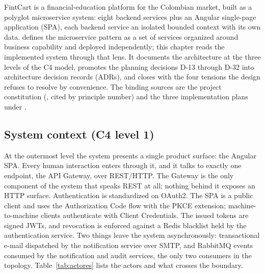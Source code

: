 FintCart is a financial-education platform for the Colombian market, built as a
polyglot microservice system: eight backend services plus an Angular single-page
application (SPA), each backend service an isolated bounded context with its own
data. \textcite{richardsonndpattern} defines the microservice pattern as a set of
services organized around business capability and deployed independently; this
chapter reads the implemented system through that lens. It documents the
architecture at the three levels of the C4 model, promotes the planning decisions
D-13 through D-32 into architecture decision records (ADRs), and closes with the
four tensions the design refuses to resolve by convenience. The binding sources
are the project constitution (, cited by
principle number) and the three implementation plans under .

\subsection{System context (C4 level 1)}

At the outermost level the system presents a single product surface: the Angular
SPA. Every human interaction enters through it, and it talks to exactly one
endpoint, the API Gateway, over REST/HTTP. The Gateway is the only component of
the system that speaks REST at all; nothing behind it exposes an HTTP surface.
Authentication is standardized on OAuth2. The SPA is a public client and uses the
Authorization Code flow with the PKCE extension; machine-to-machine clients
authenticate with Client Credentials. The issued tokens are signed JWTs, and
revocation is enforced against a Redis blacklist held by the authentication
service. Two things leave the system asynchronously: transactional e-mail
dispatched by the notification service over SMTP, and RabbitMQ events consumed by
the notification and audit services, the only two consumers in the topology.
Table~\ref{tab:actores} lists the actors and what crosses the boundary.

